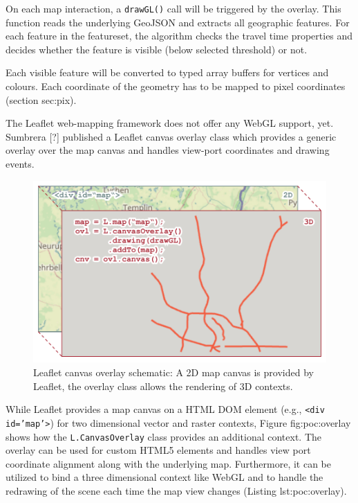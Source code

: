       On each map interaction, a \texttt{drawGL()} call will be triggered by the overlay. This function reads the underlying GeoJSON and extracts all geographic features. For each feature in the featureset, the algorithm checks the travel time properties and decides whether the feature is visible (below selected threshold) or not.\par
      Each visible feature will be converted to typed array buffers for vertices and colours. Each coordinate of the geometry has to be mapped to pixel coordinates (section {sec:pix}).\par
      The Leaflet web-mapping framework does not offer any WebGL support, yet. Sumbrera [?] published a Leaflet canvas overlay class which provides a generic overlay over the map canvas and handles view-port coordinates and drawing events.\par
      \begin{figure}[h]
        \centering
        \includegraphics[width=0.7\linewidth]{./img/leaflet-canvas-overlay.pdf}
        \caption{Leaflet canvas overlay schematic: A 2D map canvas is provided by Leaflet, the overlay class allows the rendering of 3D contexts.}
        \label{fig:poc:overlay}
      \end{figure}
      
      While Leaflet provides a map canvas on a HTML DOM element (e.g., \texttt{<div id='map'>}) for two dimensional vector and raster contexts, Figure {fig:poc:overlay} shows how the \texttt{L.CanvasOverlay} class provides an additional context. The overlay can be used for custom HTML5 elements and handles view port coordinate alignment along with the underlying map. Furthermore, it can be utilized to bind a three dimensional context like WebGL and to handle the redrawing of the scene each time the map view changes (Listing {lst:poc:overlay}).\par
